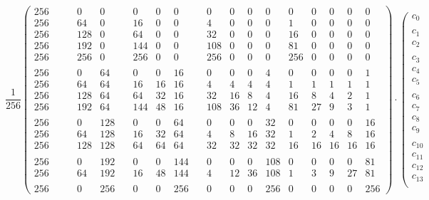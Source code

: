 \[
\frac{1}{256}
\left(
\begin{array}{lllllllllllllll}
256\qquad{} &0 & 0\qquad{}& 0  &0&0\qquad{} &0 &0&0&0\quad{} &0& 0&0&0&0\\
256 &64 &0&16 &0&0&4  &0&0&0&1&0&0&0&0 \\
256 &128&0&64 &0&0&32 &0&0&0&16&0&0&0&0 \\
256 &192&0&144&0&0&108&0&0&0&81&0&0&0&0 \\
256 &256&0&256&0&0&256&0&0&0&256&0&0&0&0 \\ 
\\
256 &0  &64&0&0&16& 0&0&0&4 &0&0&0&0&1\\
256 &64 &64&16&16&16& 4&4&4&4 &1&1&1&1&1\\
256 &128&64&64&32&16& 32&16&8&4 &16&8&4&2&1\\
256 &192&64&144&48&16& 108&36&12&4 &81&27&9&3&1\\
\\
256 & 0  &128&0 &0 &64& 0 & 0 & 0 & 32&0&0&0&0&16\\
256 & 64 &128&16&32&64& 4& 8 &16 &32  &1&2&4&8&16\\
256 & 128&128&64&64&64& 32&32&32&32 & 16&16&16&16&16\\
\\
256 & 0 & 192 & 0 & 0 & 144 & 0 & 0 & 0 & 108 & 0 & 0 & 0 & 0 & 81 \\ 
256 & 64 & 192 & 16 & 48 & 144 & 4 & 12 & 36 & 108 & 1 & 3 & 9 & 27 & 81
\\ \\
256 & 0 & 256 & 0 & 0 & 256 & 0 & 0 & 0 & 256 & 0&0 & 0 & 0 & 256
\end{array}
\right)
\cdot
\left(
\begin{array}{c}
c_0 \\ \\
c_1 \\
c_2 \\ \\
c_3 \\
c_4 \\
c_5 \\  \\
c_6 \\
c_7 \\
c_8 \\
c_9 \\ \\
c_{10} \\ 
c_{11} \\
c_{12} \\
c_{13} \\

\end{array}\]
